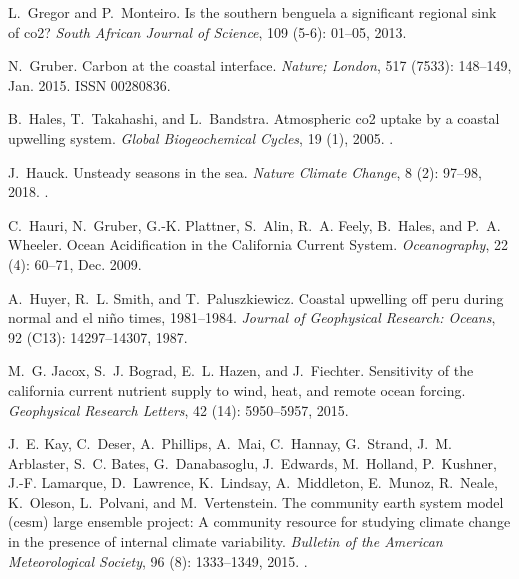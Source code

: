 \documentclass[hvmath, online,bgd]{copernicus_discussions}
\begin{document}
\begin{thebibliography}{84}
	L.~Gregor and P.~Monteiro.
	\newblock Is the southern benguela a significant regional sink of co2?
	\newblock \emph{South African Journal of Science}, 109 (5-6):
	01--05, 2013.
	
	N.~Gruber.
	\newblock Carbon at the coastal interface.
	\newblock \emph{Nature; London}, 517 (7533): 148--149, Jan.
	2015.
	\newblock ISSN 00280836.
	
	B.~Hales, T.~Takahashi, and L.~Bandstra.
	\newblock Atmospheric co2 uptake by a coastal upwelling system.
	\newblock \emph{Global Biogeochemical Cycles}, 19 (1), 2005.
	\newblock {}.
	
	J.~Hauck.
	\newblock Unsteady seasons in the sea.
	\newblock \emph{Nature Climate Change}, 8 (2): 97--98, 2018.
	\newblock {}.
	
	C.~Hauri, N.~Gruber, G.-K. Plattner, S.~Alin, R.~A. Feely, B.~Hales, and P.~A.
	Wheeler.
	\newblock Ocean {Acidification} in the {California} {Current} {System}.
	\newblock \emph{Oceanography}, 22 (4): 60--71, Dec. 2009.
	
	A.~Huyer, R.~L. Smith, and T.~Paluszkiewicz.
	\newblock Coastal upwelling off peru during normal and el ni{\~n}o times,
	1981--1984.
	\newblock \emph{Journal of Geophysical Research: Oceans}, 92
	(C13): 14297--14307, 1987.
	
	M.~G. Jacox, S.~J. Bograd, E.~L. Hazen, and J.~Fiechter.
	\newblock Sensitivity of the california current nutrient supply to wind, heat,
	and remote ocean forcing.
	\newblock \emph{Geophysical Research Letters}, 42 (14):
	5950--5957, 2015.
	
	J.~E. Kay, C.~Deser, A.~Phillips, A.~Mai, C.~Hannay, G.~Strand, J.~M.
	Arblaster, S.~C. Bates, G.~Danabasoglu, J.~Edwards, M.~Holland, P.~Kushner,
	J.-F. Lamarque, D.~Lawrence, K.~Lindsay, A.~Middleton, E.~Munoz, R.~Neale,
	K.~Oleson, L.~Polvani, and M.~Vertenstein.
	\newblock The community earth system model (cesm) large ensemble project: A
	community resource for studying climate change in the presence of internal
	climate variability.
	\newblock \emph{Bulletin of the American Meteorological Society}, 96
	(8): 1333--1349, 2015.
	\newblock {}.
	

\end{thebibliography}
\end{document}
